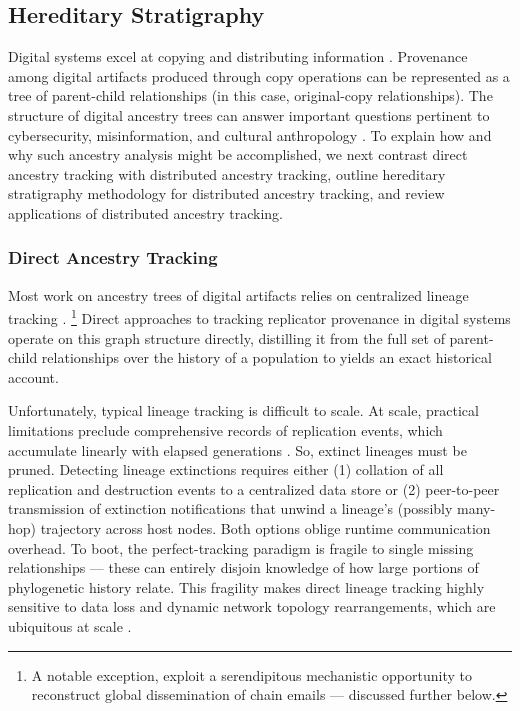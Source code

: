 \subsection{Hereditary Stratigraphy} \label{sec:hereditary-stratigraphy}

Digital systems excel at copying and distributing information \citep{miller2001taking}.
Provenance among digital artifacts produced through copy operations can be represented as a tree of parent-child relationships (in this case, original-copy relationships).
The structure of digital ancestry trees can answer important questions pertinent to cybersecurity, misinformation, and cultural anthropology \citep{aslan2020comprehensive,dupuis2019spread,ling2021dissecting}.
To explain how and why such ancestry analysis might be accomplished, we next contrast direct ancestry tracking with distributed ancestry tracking, outline hereditary stratigraphy methodology for distributed ancestry tracking, and review applications of distributed ancestry tracking.

\subsubsection{Direct Ancestry Tracking}

Most work on ancestry trees of digital artifacts relies on centralized lineage tracking \citep{friggeri2014rumor,cohen1987computer,dolson2023phylotrackpy}.%
\footnote{A notable exception, \cite{libennowell2008tracing} exploit a serendipitous mechanistic opportunity to reconstruct global dissemination of chain emails --- discussed further below.}
Direct approaches to tracking replicator provenance in digital systems operate on this graph structure directly, distilling it from the full set of parent-child relationships over the history of a population to yields an exact historical account.

Unfortunately, typical lineage tracking is difficult to scale.
At scale, practical limitations preclude comprehensive records of replication events, which accumulate linearly with elapsed generations \citep{dolson2023algorithms}.
So, extinct lineages must be pruned.
Detecting lineage extinctions requires either (1) collation of all replication and destruction events to a centralized data store or (2) peer-to-peer transmission of extinction notifications that unwind a lineage's (possibly many-hop) trajectory across host nodes.
Both options oblige runtime communication overhead.
To boot, the perfect-tracking paradigm is fragile to single missing relationships --- these can entirely disjoin knowledge of how large portions of phylogenetic history relate.
This fragility makes direct lineage tracking highly sensitive to data loss and dynamic network topology rearrangements, which are ubiquitous at scale \citep{cappello2014toward,ackley2011pursue}.

